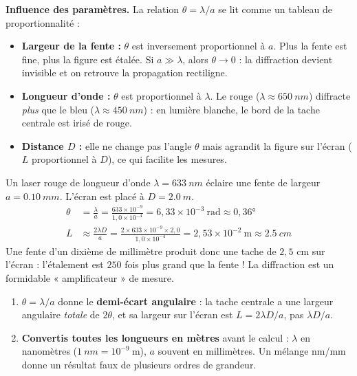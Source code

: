 \documentclass[11pt]{article}
\begin{document}
\textbf{Influence des paramètres.} La relation $\theta = \lambda/a$ se lit comme un tableau de proportionnalité :
\begin{itemize}
\item \textbf{Largeur de la fente :} $\theta$ est inversement proportionnel à $a$. Plus la fente est fine, plus la figure est étalée. Si $a \gg \lambda$, alors $\theta \to 0$ : la diffraction devient invisible et on retrouve la propagation rectiligne.
\item \textbf{Longueur d'onde :} $\theta$ est proportionnel à $\lambda$. Le rouge ($\lambda \approx \SI{650}{nm}$) diffracte \emph{plus} que le bleu ($\lambda \approx \SI{450}{nm}$) : en lumière blanche, le bord de la tache centrale est irisé de rouge.
\item \textbf{Distance $D$ :} elle ne change pas l'angle $\theta$ mais agrandit la figure sur l'écran ($L$ proportionnel à $D$), ce qui facilite les mesures.
\end{itemize}

\begin{exemplebox}
Un laser rouge de longueur d'onde $\lambda = \SI{633}{nm}$ éclaire une fente de largeur $a = \SI{0,10}{mm}$. L'écran est placé à $D = \SI{2,0}{m}$.
\begin{align*}
\theta &= \frac{\lambda}{a} = \frac{633\times 10^{-9}}{1,0\times 10^{-4}} = 6,33\times 10^{-3}\ \text{rad} \approx 0,36° \\
L &\approx \frac{2\lambda D}{a} = \frac{2\times 633\times 10^{-9}\times 2,0}{1,0\times 10^{-4}} = 2,53\times 10^{-2}\ \text{m} \approx \SI{2,5}{cm}
\end{align*}
Une fente d'un dixième de millimètre produit donc une tache de $2,5$ cm sur l'écran : l'étalement est $250$ fois plus grand que la fente ! La diffraction est un formidable « amplificateur » de mesure.
\end{exemplebox}

\begin{attention}
\begin{enumerate}
\item $\theta = \lambda/a$ donne le \textbf{demi-écart angulaire} : la tache centrale a une largeur angulaire \emph{totale} de $2\theta$, et sa largeur sur l'écran est $L = 2\lambda D/a$, pas $\lambda D/a$.
\item \textbf{Convertis toutes les longueurs en mètres} avant le calcul : $\lambda$ en nanomètres ($\SI{1}{nm} = 10^{-9}\ \text{m}$), $a$ souvent en millimètres. Un mélange nm/mm donne un résultat faux de plusieurs ordres de grandeur.
\end{enumerate}
\end{attention}
\end{document}
